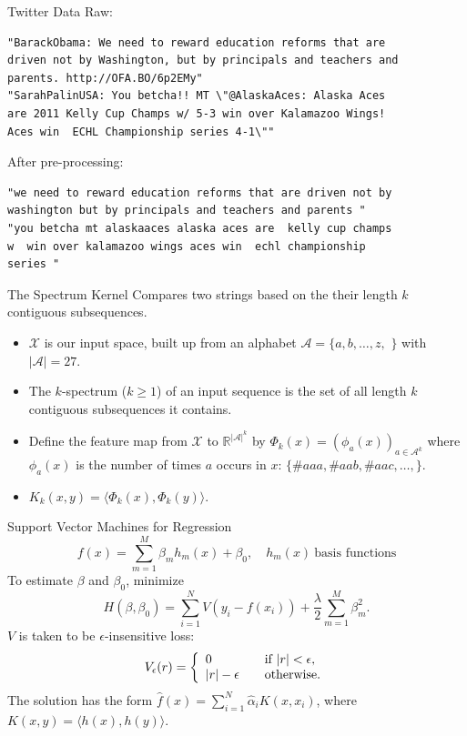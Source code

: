 \documentclass{beamer}
\begin{document}
\begin{frame}[fragile]{Twitter Data}
  Raw: 
\begin{verbatim}
"BarackObama: We need to reward education reforms that are 
driven not by Washington, but by principals and teachers and
parents. http://OFA.BO/6p2EMy"
"SarahPalinUSA: You betcha!! MT \"@AlaskaAces: Alaska Aces 
are 2011 Kelly Cup Champs w/ 5-3 win over Kalamazoo Wings! 
Aces win  ECHL Championship series 4-1\""
\end{verbatim}
  After pre-processing:
\begin{verbatim}
"we need to reward education reforms that are driven not by 
washington but by principals and teachers and parents "
"you betcha mt alaskaaces alaska aces are  kelly cup champs 
w  win over kalamazoo wings aces win  echl championship 
series "
\end{verbatim}
\end{frame}

\begin{frame}{The Spectrum Kernel}
  Compares two strings based on the their length $k$ contiguous
  subsequences. \pause
  \begin{itemize}
  \item $\mathcal{X}$ is our input space, built up from an alphabet
    $\mathcal{A} = \{a,b,\ldots,z,$ $\}$ with $|\mathcal{A}|=27$. \pause
  \item The $k$-spectrum ($k \geq 1$) of an input sequence is the set
    of all length $k$ contiguous subsequences it contains. \pause
  \item Define the feature map from $\mathcal{X}$ to
    $\mathbb{R}^{|\mathcal{A}|^k}$ by $\Phi_k(x) = (\phi_a(x))_{a \in
      \mathcal{A}^k}$ where $\phi_a(x)$ is the number of times $a$
    occurs in $x$: $\{\#aaa,\#aab,\#aac,\ldots,\}$. \pause
  \item $K_k(x,y) = \langle \Phi_k(x),\Phi_k(y) \rangle$.
  \end{itemize}
\end{frame}

\begin{frame}{Support Vector Machines for Regression}
  $$
  f(x) = \sum_{m=1}^M \beta_m h_m(x) + \beta_0, \quad {h_m(x)} \:
\text{basis functions}
  $$
  \pause 
  To estimate $\beta$ and $\beta_0$, minimize
  $$
  H(\beta,\beta_0) = \sum_{i=1}^N V(y_i-f(x_i)) +
  \frac{\lambda}{2}\sum_{m=1}^M \beta_m^2.
  $$
  \pause
  $V$ is taken to be $\epsilon$-insensitive loss:
  \[
  V_\epsilon(r) = \left\{ 
    \begin{array}{l l}
      0 & \quad \text{if } |r| < \epsilon,\\
      |r|-\epsilon & \quad \text{otherwise.}\\
    \end{array} \right.
  \]
  \pause
  The solution has the form $\hat{f}(x)=\sum_{i=1}^N \hat\alpha_i
  K(x,x_i)$, where $K(x,y)=\langle h(x),h(y) \rangle$.
\end{frame}
\end{document}
